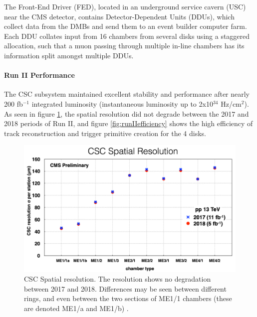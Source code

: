 \documentclass[a4paper,11pt]{article}
\begin{document}
The Front-End Driver (FED), located in an underground service cavern (USC) near the CMS detector, contains Detector-Dependent Units (DDUs), which collect data from the DMBs and send them to an event builder computer farm. Each DDU collates input from 16 chambers from several disks using a staggered allocation, such that a muon passing through multiple in-line chambers has its information split amongst multiple DDUs.

\paragraph{Run II Performance}
The CSC subsystem maintained excellent stability and performance after nearly 200 fb$^{-1}$ integrated luminosity (instantaneous luminosity up to 2x10$^{34}$ Hz/cm$^2$). As seen in figure \ref{fig:runIIresolution}, the spatial resolution did not degrade between the 2017 and 2018 periods of Run II, and figure \ref{fig:runIIefficiency} shows the high efficiency of track reconstruction and trigger primitive creation for the 4 disks.
\begin{figure}[htbp]
\centering %
\includegraphics[width=.9\textwidth]{CSCSpatialResolution.png}
\caption{\label{fig:runIIresolution} CSC Spatial resolution. The resolution shows no degradation between 2017 and 2018. Differences may be seen between different rings, and even between the two sections of ME1/1 chambers (these are denoted ME1/a and ME1/b) \cite{muonpublicresults}.}
\end{figure}
\end{document}
